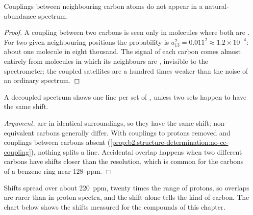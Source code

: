 \begin{proposition}\label{prop:b2:structure-determination:no-cc-coupling}
Couplings between neighbouring carbon atoms do not appear in a natural-abundance 
spectrum.
\end{proposition}

\begin{proof}
A coupling between two carbons is seen only in molecules where both are . For two given
neighbouring positions the probability is $a_{13}^2 = 0.011^2 \approx 1.2 \times 10^{-4}$: about one
molecule in eight thousand. The signal of each carbon comes almost entirely from molecules in which its
neighbours are , invisible to the spectrometer; the coupled satellites are a hundred times
weaker than the noise of an ordinary spectrum.
\end{proof}

\begin{proposition}\label{prop:b2:structure-determination:signals}
A decoupled  spectrum shows one line per set of , unless two sets happen to
have the same shift.
\end{proposition}

\begin{proof}[Argument]
 are in identical surroundings, so they have the same shift; non-equivalent carbons
generally differ. With couplings to protons removed and couplings between carbons absent
(\cref{prop:b2:structure-determination:no-cc-coupling}), nothing splits a line. Accidental overlap
happens when two different carbons have shifts closer than the resolution, which is common for the
carbons of a benzene ring near \qty{128}{ppm}.
\end{proof}

Shifts spread over about \qty{220}{ppm}, twenty times the range of protons, so overlaps are rarer than
in proton spectra, and the shift alone tells the kind of carbon. The chart below shows the shifts
measured for the compounds of this chapter.

